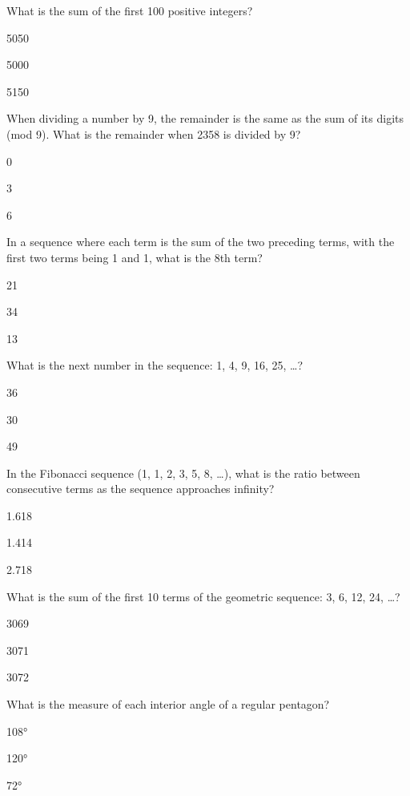 
\begin{enhancedmcq}{What is the sum of the first 100 positive integers?}
\item 5050
\item 5000
\item 5150

\end{enhancedmcq}
\begin{enhancedmcq}{When dividing a number by 9, the remainder is the same as the sum of its digits (mod 9). What is the remainder when 2358 is divided by 9?}
\item 0
\item 3
\item 6

\end{enhancedmcq}
\begin{enhancedmcq}{In a sequence where each term is the sum of the two preceding terms, with the first two terms being 1 and 1, what is the 8th term?}
\item 21
\item 34
\item 13

\end{enhancedmcq}
\begin{enhancedmcq}{What is the next number in the sequence: 1, 4, 9, 16, 25, …?}
\item 36
\item 30
\item 49

\end{enhancedmcq}
\begin{enhancedmcq}{In the Fibonacci sequence (1, 1, 2, 3, 5, 8, …), what is the ratio between consecutive terms as the sequence approaches infinity?}
\item 1.618
\item 1.414
\item 2.718

\end{enhancedmcq}
\begin{enhancedmcq}{What is the sum of the first 10 terms of the geometric sequence: 3, 6, 12, 24, …?}
\item 3069
\item 3071
\item 3072

\end{enhancedmcq}
\begin{enhancedmcq}{What is the measure of each interior angle of a regular pentagon?}
\item 108°
\item 120°
\item 72°

\end{enhancedmcq}
